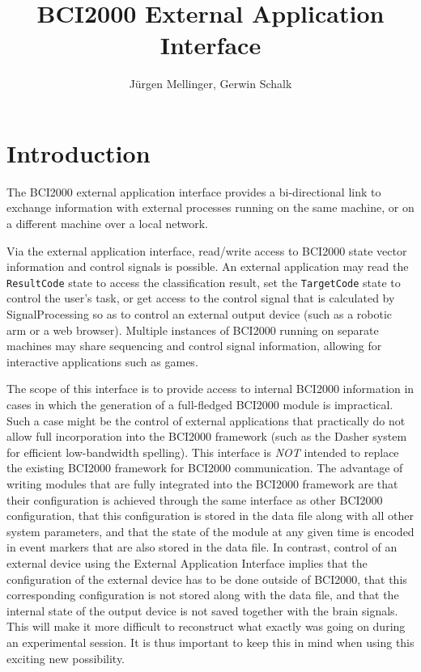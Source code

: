 \documentclass[12pt,letterpaper,notitlepage]{article}
\title{BCI2000 External Application Interface}
\author{J\"{u}rgen Mellinger, Gerwin Schalk}
\begin{document}
\maketitle
\tableofcontents

\pagebreak
\section{Introduction}

The BCI2000 external application interface provides a bi-directional link to exchange 
information with external processes running on the same machine, or on a different machine
over a local network.

Via the external application interface, read/write access to BCI2000 state 
vector information and control signals is possible. An external application may 
read the \texttt{ResultCode} state to access the classification result, set the 
\texttt{TargetCode} state to control the user's task, or get access to the 
control signal that is calculated by SignalProcessing so as to control an 
external output device (such as a robotic arm or a web browser). Multiple 
instances of BCI2000 running on separate machines may share sequencing and 
control signal information, allowing for interactive applications such as games.

The scope of this interface is to provide access to internal BCI2000 information 
in cases in which the generation of a full-fledged BCI2000 module is 
impractical. Such a case might be the control of external applications that 
practically do not allow full incorporation into the BCI2000 framework (such as 
the Dasher system for efficient low-bandwidth spelling). This interface is 
\emph{NOT} intended to replace the existing BCI2000 framework for BCI2000 
communication. The advantage of writing modules that are fully integrated into 
the BCI2000 framework are that their configuration is achieved through the same 
interface as other BCI2000 configuration, that this configuration is stored in 
the data file along with all other system parameters, and that the state of the 
module at any given time is encoded in event markers that are also stored in the 
data file. In contrast, control of an external device using the External 
Application Interface implies that the configuration of the external device has 
to be done outside of BCI2000, that this corresponding configuration is not 
stored along with the data file, and that the internal state of the output 
device is not saved together with the brain signals. This will make it more 
difficult to reconstruct what exactly was going on during an experimental 
session. It is thus important to keep this in mind when using this exciting new 
possibility.
\end{document}
